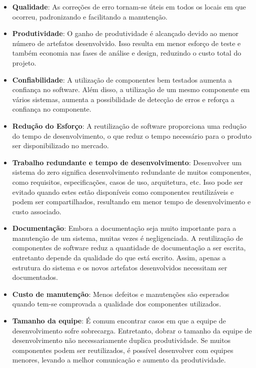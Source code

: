 \begin{itemize}

\item \textbf{Qualidade}: As correções de erro tornam-se úteis em todos os locais em que ocorreu, padronizando e facilitando a manutenção.

\item \textbf{Produtividade}: O ganho de produtividade é alcançado devido ao menor número de artefatos desenvolvido. Isso resulta em menor esforço de teste e também economia nas fases de análise e design, reduzindo o custo total do projeto.

\item \textbf{Confiabilidade}: A utilização de componentes bem testados aumenta a
confiança no software. Além disso, a utilização de um mesmo componente em vários sistemas, aumenta a possibilidade de detecção de erros e reforça a confiança no componente.

\item \textbf{Redução do Esforço}: A reutilização de software proporciona uma redução do tempo de desenvolvimento, o que reduz o tempo necessário para o produto ser disponibilizado no mercado.

\item \textbf{Trabalho redundante e tempo de desenvolvimento}: Desenvolver um sistema do
zero significa desenvolvimento redundante de muitos componentes, como requisitos, especificações, casos de uso, arquitetura, etc. Isso pode ser evitado quando estes estão disponíveis como componentes reutilizáveis e podem ser compartilhados, resultando em menor tempo de desenvolvimento e custo associado.

\item \textbf{Documentação}: Embora a documentação seja muito importante para a
manutenção de um sistema, muitas vezes é negligenciada. A reutilização de componentes de software reduz a quantidade de documentação a ser escrita, entretanto depende da qualidade do que está escrito. Assim, apenas a estrutura do sistema e os novos artefatos desenvolvidos necessitam ser documentados.

\item \textbf{Custo de manutenção}: Menos defeitos e manutenções são esperados quando tem-se comprovada a qualidade dos componentes utilizados.

\item \textbf{Tamanho da equipe}: É comum encontrar casos em que a equipe de desenvolvimento sofre sobrecarga. Entretanto, dobrar o tamanho da equipe de desenvolvimento não necessariamente duplica produtividade. Se muitos componentes podem ser reutilizados, é possível desenvolver com equipes menores, levando a melhor comunicação e aumento da produtividade.

\end{itemize}

